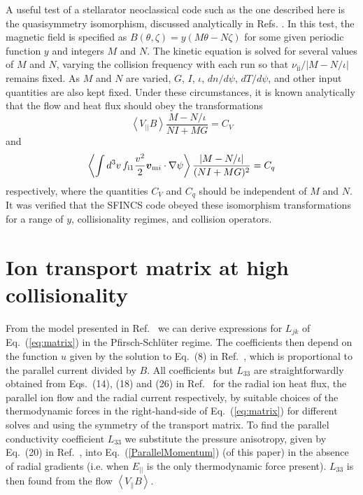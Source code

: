 \documentclass[12pt]{revtex4}
\newcommand{\vect}[1]{\mbox{\boldmath $#1$}}
\newcommand{\nuii}{\nu_{\mathrm{ii}}}
\begin{document}
A useful test of a stellarator neoclassical code such as the one
described here is the quasisymmetry isomorphism,
discussed analytically in Refs. \cite{Pytte, Boozer83, meQS}.
In this test, the magnetic field is specified as $B(\theta,\zeta) = y(M\theta-N\zeta)$
for some given periodic function $y$ and integers $M$ and $N$.
The kinetic equation is solved for several values of $M$ and $N$,
varying the collision frequency with each run so that
$\nuii / \left|M - N/\iota \right|$ remains fixed.
As $M$ and $N$ are varied, $G$, $I$, $\iota$, $dn/d\psi$, $dT/d\psi$, and other input quantities are also kept fixed.
Under these circumstances, it is known analytically \cite{Pytte, Boozer83, meQS} that the flow
and heat flux should obey the transformations
\begin{equation}
\left< V_{||} B \right> \frac{M-N/\iota}{NI+MG} = C_V
\end{equation}
and
\begin{equation}
\left< \int d^3v\, f_{\mathrm{i}1} \frac{v^2}{2}\vect{v}_{\mathrm{m}i}\cdot\nabla\psi \right> \frac{\left| M-N/\iota\right| }{(NI+MG)^2} = C_q
\end{equation}
respectively, where the quantities $C_V$ and $C_q$ should be independent of $M$ and $N$.
It was verified that the SFINCS code obeyed these isomorphism transformations
for a range of $y$, collisionality regimes, and collision operators.




\section{Ion transport matrix at high collisionality}
From the model presented in Ref.~\cite{AndreiPer2009} we can derive expressions for $L_{jk}$ of Eq.~(\ref{eq:matrix}) in the Pfirsch-Schl{\"u}ter regime. 
The coefficients then depend on the function $u$ given by the solution to Eq.~(8) in Ref.~\cite{AndreiPer2009}, which is proportional to the parallel current divided by $B$. 
All coefficients but $L_{33}$ are straightforwardly obtained from Eqs.~(14), (18) and (26) in Ref.~\cite{AndreiPer2009} for the radial ion heat flux, the parallel ion flow and the radial current respectively, by %
suitable choices of 
the thermodynamic forces in the right-hand-side of Eq.~(\ref{eq:matrix}) for different solves and using the symmetry of the transport matrix.
To find the parallel conductivity coefficient $L_{33}$ we substitute the pressure anisotropy, given by Eq.~(20) in Ref.~\cite{AndreiPer2009}, into Eq.~(\ref{ParallelMomentum}) (of this paper) 
in the absence of radial gradients (i.e. when $E_{||}$ is the only thermodynamic force present). $L_{33}$ is then found from the flow $\left< V_\| B \right>$.
\end{document}
